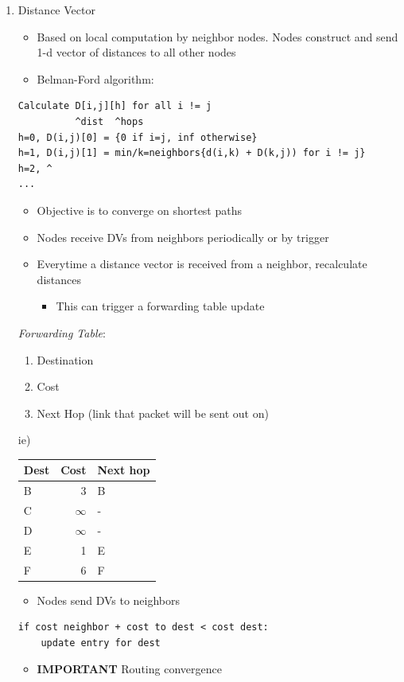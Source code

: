\documentclass[11pt]{article}
\begin{document}
\begin{enumerate}
\item Distance Vector
\label{sec:orgheadline73}
\begin{itemize}
\item Based on local computation by neighbor nodes. Nodes construct and
send 1-d vector of distances to all other nodes
\item Belman-Ford algorithm:
\end{itemize}

\begin{verbatim}
Calculate D[i,j][h] for all i != j
          ^dist  ^hops
h=0, D(i,j)[0] = {0 if i=j, inf otherwise}
h=1, D(i,j)[1] = min/k=neighbors{d(i,k) + D(k,j)) for i != j}
h=2, ^
...
\end{verbatim}

\begin{itemize}
\item Objective is to converge on shortest paths
\item Nodes receive DVs from neighbors periodically or by trigger
\item Everytime a distance vector is received from a neighbor, recalculate
distances
\begin{itemize}
\item This can trigger a forwarding table update
\end{itemize}
\end{itemize}

\emph{Forwarding Table}:
\begin{enumerate}
\item Destination
\item Cost
\item Next Hop (link that packet will be sent out on)
\end{enumerate}

ie)
\begin{center}
\begin{tabular}{lrl}
\hline
Dest & Cost & Next hop\\
\hline
B & 3 & B\\
C & \(\infty\) & -\\
D & \(\infty\) & -\\
E & 1 & E\\
F & 6 & F\\
\hline
\end{tabular}
\end{center}

\begin{itemize}
\item Nodes send DVs to neighbors
\end{itemize}

\begin{verbatim}
if cost neighbor + cost to dest < cost dest:
    update entry for dest
\end{verbatim}

\begin{itemize}
\item \textbf{IMPORTANT} Routing convergence
\end{itemize}
\end{enumerate}
\end{document}
